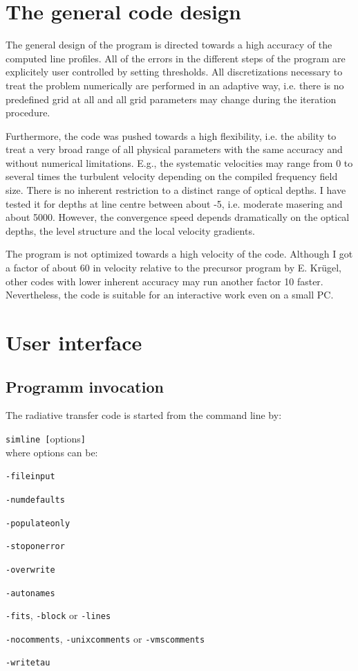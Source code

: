 \section{The general code design}

The general design of the program is directed towards a high
accuracy of the computed line profiles. All of the errors in
the different steps of the program are explicitely user 
controlled by setting thresholds. All discretizations
necessary to treat the problem numerically are performed in
an adaptive way, i.e. there is no predefined grid at all
and all grid parameters may change during the iteration procedure.

Furthermore, the code was pushed towards a high flexibility,
i.e. the ability to treat a very broad range of all physical
parameters with the same accuracy and without numerical
limitations. E.g., the systematic velocities may range from
0 to several times the turbulent velocity depending on the
compiled frequency field size.
There is no inherent restriction to a distinct range of optical
depths. I have tested it for depths at line centre between about -5,
i.e. moderate masering and about 5000. However, the convergence
speed depends dramatically on the optical depths, the
level structure and the local velocity gradients.

The program is not optimized towards a high velocity of the
code. Although I got a factor of about 60 in velocity relative
to the precursor program by E. Kr\"ugel, other codes with lower inherent
accuracy may run another factor 10 faster. Nevertheless,
the code is suitable for an interactive work even on  a small
PC.

\section{User interface}

\subsection{Programm invocation}

The radiative transfer code is started from the command line by:

{\tt simline [}options{\tt ]}\\
where options can be:
\begin{description}
\item{}{\tt -fileinput}
\item{}{\tt -numdefaults}
\item{}{\tt -populateonly}
\item{}{\tt -stoponerror}
\item{}{\tt -overwrite}
\item{}{\tt -autonames}
\item{}{\tt -fits}, {\tt -block} or {\tt -lines}
\item{}{\tt -nocomments}, {\tt -unixcomments} or {\tt -vmscomments}
\item{}{\tt -writetau}
\end{description}

